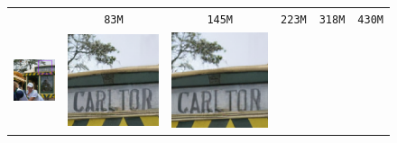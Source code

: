 \begin{figure}[!ht]
\begin{tabular}[t]{c c c c c c}
    \\[-0.2em]
    & \scriptsize \texttt{83M} & \scriptsize \texttt{145M} & \scriptsize \texttt{223M} & \scriptsize \texttt{318M} & \scriptsize \texttt{430M}
    \\
    \multirow[t]{3}{*}{
    \includegraphics[width=0.2645\linewidth, height=0.2645\linewidth]{cp2/figures/sr/scaling_sr_lr_2.png}
    } &
    \includegraphics[width=\xwidth]{cp2/figures/sr/scaling_sr_c256_2.png} &
    \includegraphics[width=\xwidth]{cp2/figures/sr/scaling_sr_c320_2.png} &

\end{tabular}
\end{figure}
